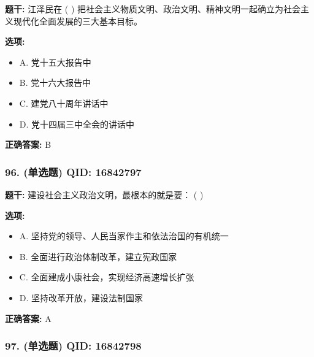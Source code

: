 \documentclass[12pt,UTF8]{ctexart}
\begin{document}
\textbf{题干:}
江泽民在 ( ) 把社会主义物质文明、政治文明、精神文明一起确立为社会主义现代化全面发展的三大基本目标。

\textbf{选项:}
\begin{itemize}[leftmargin=*]

  \item A. 党十五大报告中

  \item B. 党十六大报告中

  \item C. 建党八十周年讲话中

  \item D. 党十四届三中全会的讲话中

\end{itemize}

\textbf{正确答案:}
B

\vspace{0.3em}\hrulefill\vspace{0.7em}

\subsubsection*{96. (单选题) \small QID: 16842797}

\textbf{题干:}
建设社会主义政治文明，最根本的就是要： ( )

\textbf{选项:}
\begin{itemize}[leftmargin=*]

  \item A. 坚持党的领导、人民当家作主和依法治国的有机统一

  \item B. 全面进行政治体制改革，建立宪政国家

  \item C. 全面建成小康社会，实现经济高速增长扩张

  \item D. 坚持改革开放，建设法制国家

\end{itemize}

\textbf{正确答案:}
A

\vspace{0.3em}\hrulefill\vspace{0.7em}

\subsubsection*{97. (单选题) \small QID: 16842798}
\end{document}
